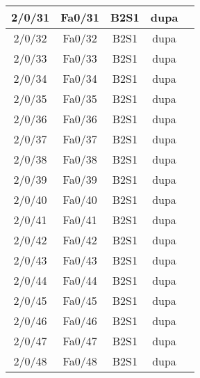 \begin{center}
\begin{longtable}{|c|c|c|c|c|}
	2/0/31 & Fa0/31 & B2S1 & dupa \\ \hline
	2/0/32 & Fa0/32 & B2S1 & dupa \\ \hline
	2/0/33 & Fa0/33 & B2S1 & dupa \\ \hline
	2/0/34 & Fa0/34 & B2S1 & dupa \\ \hline
	2/0/35 & Fa0/35 & B2S1 & dupa \\ \hline
	2/0/36 & Fa0/36 & B2S1 & dupa \\ \hline
	2/0/37 & Fa0/37 & B2S1 & dupa \\ \hline
	2/0/38 & Fa0/38 & B2S1 & dupa \\ \hline
	2/0/39 & Fa0/39 & B2S1 & dupa \\ \hline
	2/0/40 & Fa0/40 & B2S1 & dupa \\ \hline
	2/0/41 & Fa0/41 & B2S1 & dupa \\ \hline
	2/0/42 & Fa0/42 & B2S1 & dupa \\ \hline
	2/0/43 & Fa0/43 & B2S1 & dupa \\ \hline
	2/0/44 & Fa0/44 & B2S1 & dupa \\ \hline
	2/0/45 & Fa0/45 & B2S1 & dupa \\ \hline
	2/0/46 & Fa0/46 & B2S1 & dupa \\ \hline
	2/0/47 & Fa0/47 & B2S1 & dupa \\ \hline
	2/0/48 & Fa0/48 & B2S1 & dupa \\ \hline
    \end{longtable}
\end{center}

